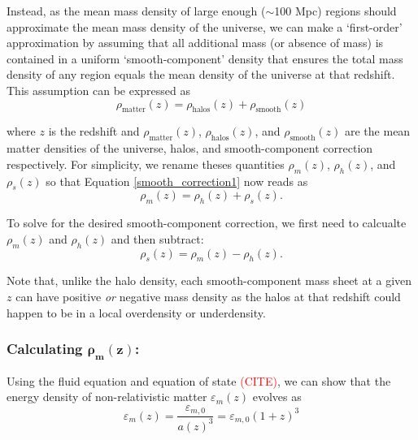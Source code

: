 \documentclass[%
 reprint,
 amsmath,amssymb,
 aps,nofootinbib
]{revtex4-1}
\begin{document}
Instead, as the mean mass density of large enough ($\sim$100 Mpc) regions should approximate the mean mass density of the universe, we can make a `first-order' approximation by assuming that all additional mass (or absence of mass) is contained in a uniform `smooth-component' density that ensures the total mass density of any region equals the mean density of the universe at that redshift. This assumption can be expressed as
\begin{equation}\label{smooth_correction1}
\rho_{\text{matter}}(z)=\rho_{\text{halos}}(z)+\rho_{\text{smooth}}(z)
\end{equation}

\noindent where $z$ is the redshift and $\rho_{\text{matter}}(z)$, $\rho_{\text{halos}}(z)$, and $\rho_{\text{smooth}}(z)$ are the mean matter densities of the universe, halos, and smooth-component correction respectively. For simplicity, we rename theses quantities ${\rho_m(z)}$, ${\rho_h(z)}$, and ${\rho_s(z)}$ so that Equation \eqref{smooth_correction1} now reads as
\begin{equation}\label{smooth_correction2}
\rho_m(z)=\rho_h(z)+\rho_s(z).
\end{equation}

To solve for the desired smooth-component correction, we first need to calcualte ${\rho_m(z)}$ and ${\rho_h(z)}$ and then subtract:
\begin{equation}\label{smooth_correction2}
\rho_s(z)=\rho_m(z)-\rho_h(z).
\end{equation}

\noindent Note that, unlike the halo density, each smooth-component mass sheet at a given $z$ can have positive \textit{or} negative mass density as the halos at that redshift could happen to be in a local overdensity or underdensity.

\subsubsection{Calculating $\mathbf{\rho_m(z)}$:}

Using the fluid equation and equation of state \textcolor{red}{(CITE)}, we can show that the energy density of non-relativistic matter $\varepsilon_m(z)$ evolves as
\begin{equation}\label{energy_evol}
\varepsilon_m(z)=\frac{\varepsilon_{m,0}}{a(z)^3}=\varepsilon_{m,0}(1+z)^3
\end{equation}
\end{document}
